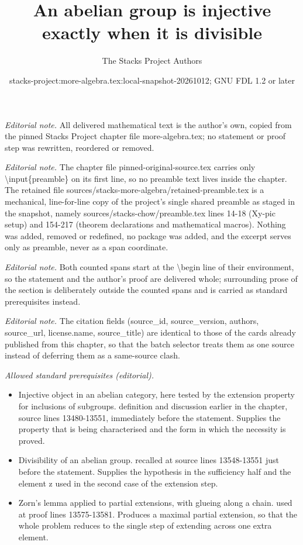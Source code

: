 \documentclass[10pt,a4paper]{amsart}
\title{An abelian group is injective exactly when it is divisible}
\author{The Stacks Project Authors}
\date{stacks-project:more-algebra.tex:local-snapshot-20261012; GNU FDL 1.2 or later}
\theoremstyle{plain}
\theoremstyle{definition}
\theoremstyle{remark}
\numberwithin{equation}{subsection}
\begin{document}
\maketitle
\setcounter{subsection}{1}
\noindent\textit{Editorial note.} All delivered mathematical text is the author's own, copied from the pinned Stacks Project chapter file more-algebra.tex; no statement or proof step was rewritten, reordered or removed.\par\medskip
\noindent\textit{Editorial note.} The chapter file pinned-original-source.tex carries only \textbackslash{}input\{preamble\} on its first line, so no preamble text lives inside the chapter. The retained file sources/stacks-more-algebra/retained-preamble.tex is a mechanical, line-for-line copy of the project's single shared preamble as staged in the snapshot, namely sources/stacks-chow/preamble.tex lines 14-18 (Xy-pic setup) and 154-217 (theorem declarations and mathematical macros). Nothing was added, removed or redefined, no package was added, and the excerpt serves only as preamble, never as a span coordinate.\par\medskip
\noindent\textit{Editorial note.} Both counted spans start at the \textbackslash{}begin line of their environment, so the statement and the author's proof are delivered whole; surrounding prose of the section is deliberately outside the counted spans and is carried as standard prerequisites instead.\par\medskip
\noindent\textit{Editorial note.} The citation fields (source\_id, source\_version, authors, source\_url, license.name, source\_title) are identical to those of the cards already published from this chapter, so that the batch selector treats them as one source instead of deferring them as a same-source clash.\par\medskip
\noindent\textit{Allowed standard prerequisites (editorial).}\begin{itemize}
\item Injective object in an abelian category, here tested by the extension property for inclusions of subgroups. definition and discussion earlier in the chapter, source lines 13480-13551, immediately before the statement. Supplies the property that is being characterised and the form in which the necessity is proved.
\item Divisibility of an abelian group. recalled at source lines 13548-13551 just before the statement. Supplies the hypothesis in the sufficiency half and the element z used in the second case of the extension step.
\item Zorn's lemma applied to partial extensions, with glueing along a chain. used at proof lines 13575-13581. Produces a maximal partial extension, so that the whole problem reduces to the single step of extending across one extra element.
\end{itemize}\medskip
\end{document}
